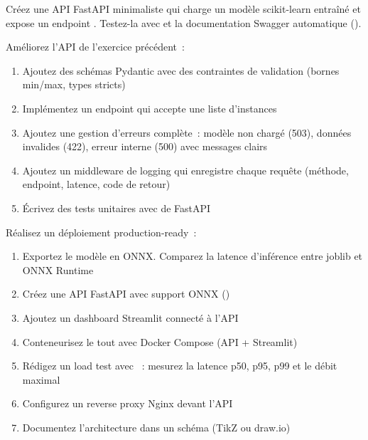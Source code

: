 \begin{exercice}
Cr\'eez une API FastAPI minimaliste qui charge un mod\`ele scikit-learn
entra\^in\'e et expose un endpoint . Testez-la avec
 et la documentation Swagger automatique
().
\end{exercice}

\begin{exercice}
Am\'eliorez l'API de l'exercice pr\'ec\'edent~:
\begin{enumerate}
  \item Ajoutez des sch\'emas Pydantic avec des contraintes de validation
    (bornes min/max, types stricts)
  \item Impl\'ementez un endpoint  qui accepte une
    liste d'instances
  \item Ajoutez une gestion d'erreurs compl\`ete~: mod\`ele non charg\'e
    (503), donn\'ees invalides (422), erreur interne (500) avec messages
    clairs
  \item Ajoutez un middleware de logging qui enregistre chaque requ\^ete
    (m\'ethode, endpoint, latence, code de retour)
  \item \'Ecrivez des tests unitaires avec  de FastAPI
\end{enumerate}
\end{exercice}

\begin{exercice}
R\'ealisez un d\'eploiement production-ready~:
\begin{enumerate}
  \item Exportez le mod\`ele en ONNX. Comparez la latence d'inf\'erence
    entre joblib et ONNX Runtime
  \item Cr\'eez une API FastAPI avec support ONNX ()
  \item Ajoutez un dashboard Streamlit connect\'e \`a l'API
  \item Conteneurisez le tout avec Docker Compose (API + Streamlit)
  \item R\'edigez un load test avec ~: mesurez la latence
    p50, p95, p99 et le d\'ebit maximal
  \item Configurez un reverse proxy Nginx devant l'API
  \item Documentez l'architecture dans un sch\'ema (TikZ ou draw.io)
\end{enumerate}
\end{exercice}

